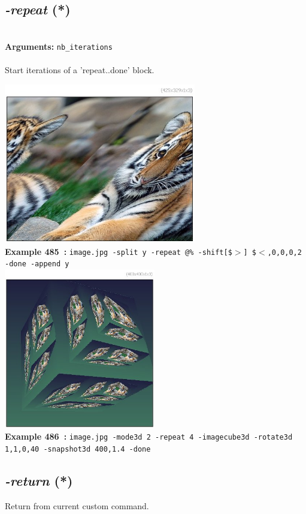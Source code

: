 \documentclass[a4paper,11pt,twoside]{book}
\begin{document}
\subsection{\emph{-repeat} (*)}\vspace*{-0.5em}
~\\\textbf{Arguments: } 
{\small \texttt{nb\_iterations}}\\~\\
Start iterations of a 'repeat..done' block.
\begin{center}\includegraphics[keepaspectratio=true,height=7cm,width=\textwidth]{img/gmic_def485.jpg}\\
{\footnotesize \textbf{Example 485~:} \texttt{image.jpg -split y -repeat @\% -shift[\$$>$] \$$<$,0,0,0,2 -done -append y}}
\\\includegraphics[keepaspectratio=true,height=7cm,width=\textwidth]{img/gmic_def486.jpg}\\
{\footnotesize \textbf{Example 486~:} \texttt{image.jpg -mode3d 2 -repeat 4 -imagecube3d -rotate3d 1,1,0,40 -snapshot3d 400,1.4 -done}}
\end{center}

\subsection{\emph{-return} (*)}\vspace*{-0.5em}
Return from current custom command.
\end{document}
